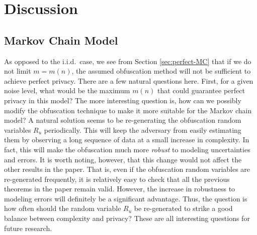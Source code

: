 \section{Discussion}
\label{discussion}
\subsection{Markov Chain Model}
\label{markov}
As opposed to the i.i.d.\ case, we see from Section \ref{sec:perfect-MC} that if we do not limit $m=m(n)$, the assumed obfuscation method will not be sufficient to achieve perfect privacy. There are a few natural questions here. First, for a given noise level, what would be the maximum $m(n)$ that could guarantee perfect privacy in this model? The more interesting question is, how can we possibly modify the obfuscation technique to make it more suitable for the Markov chain model? A natural solution seems to be re-generating the obfuscation random variables $R_u$ periodically. This will keep the adversary from easily estimating them by observing a long sequence of data at a small increase in complexity. In fact, this will make the obfuscation much more \emph{robust} to modeling uncertainties and errors. It is worth noting, however, that this change would not affect the other results in the paper. That is, even if the obfuscation random variables are re-generated frequently, it is relatively easy to check that all the previous theorems in the paper remain valid. However, the increase in robustness to modeling errors will definitely be a significant advantage. Thus, the question is how often should the random variable $R_u$ be re-generated to strike a good balance between complexity and privacy? These are all interesting questions for future research.


